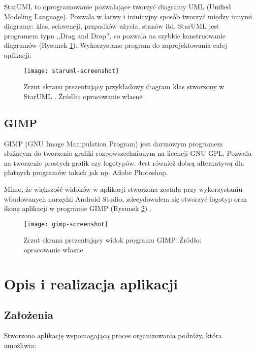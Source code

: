 \documentclass[a4paper,12pt]{article}
\newcommand{\imagewidth}{1.0}
\begin{document}
StarUML to oprogramowanie pozwalające tworzyć diagramy UML (Unified Modeling Language). Pozwala w łatwy i intuicyjny sposób tworzyć między innymi diagramy: klas, sekwencji, przpadków użycia, stanów itd. StarUML jest programem typu ,,Drag and Drop'', co pozwala na szybkie konstruowanie diagramów (Rysunek \ref{fig:staruml-screenshot}). Wykorzystano program do zaprojektowania całej aplikacji.

\begin{figure}[H]
    \centering
    \texttt{[image: staruml-screenshot]}
    \caption{Zrzut ekranu prezentujący przykładowy diagram klas stworzony w StarUML \cite{staruml}. Źródło: opracowanie własne}
    \label{fig:staruml-screenshot}
\end{figure}

\subsection{GIMP}

GIMP (GNU Image Manipulation Program) jest darmowym programem służącym do tworzenia grafiki rozpowszechnionym na licencji GNU GPL. Pozwala na tworzenie prostych grafik czy logotypów. Jest również dobrą alternatywą dla płatnych programów takich jak np. Adobe Photoshop.

Mimo, że większość widoków w aplikacji stworzona została przy wykorzystaniu wbudowanych narzędzi Android Studio, zdecydowałem się stworzyć logotyp oraz ikonę aplikacji w programie GIMP (Rysunek \ref{fig:gimp-screenshot}) .

\begin{figure}[H]
    \centering
    \texttt{[image: gimp-screenshot]}
    \caption{Zrzut ekranu prezentujący widok programu GIMP. Źródło: opracowanie własne}
    \label{fig:gimp-screenshot}
\end{figure}

\newpage
\section{Opis i realizacja aplikacji}

\subsection{Założenia}

Stworzono aplikację wspomagającą proces organizowania podróży, która umożliwia:
\end{document}
